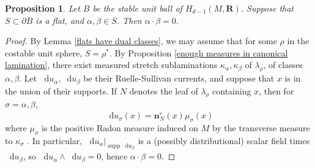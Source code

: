 \documentclass[reqno,11pt]{amsart}
\newcommand{\RR}{\mathbf{R}}
\newcommand*\dif{\mathop{}\!\mathrm{d}}
\DeclareMathOperator{\supp}{supp}
\newcommand{\normal}{\mathbf n}
\newtheorem{proposition}[theorem]{Proposition}
\theoremstyle{definition}
\numberwithin{equation}{section}
\begin{document}
\begin{proposition}\label{flats are nonintersecting}
Let $B$ be the stable unit ball of $H_{d - 1}(M, \RR)$.
Suppose that $S \subset \partial B$ is a flat, and $\alpha, \beta \in S$.
Then $\alpha \cdot \beta = 0$.
\end{proposition}
\begin{proof}
By Lemma \ref{flats have dual classes}, we may assume that for some $\rho$ in the costable unit sphere, $S = \rho^*$.
By Proposition \ref{enough measures in canonical lamination}, there exist measured stretch sublaminations $\kappa_\alpha, \kappa_\beta$ of $\lambda_\rho$, of classes $\alpha, \beta$.
Let $\dif u_\alpha, \dif u_\beta$ be their Ruelle-Sullivan currents, and suppose that $x$ is in the union of their supports.
If $N$ denotes the leaf of $\lambda_\rho$ containing $x$, then for $\sigma = \alpha, \beta$,
$$\dif u_\sigma(x) = \normal_N^\flat(x) \mu_\sigma(x)$$
where $\mu_\sigma$ is the positive Radon measure induced on $M$ by the transverse measure to $\kappa_\sigma$ \cite[Lemma 3.1]{BackusCML}.
In particular, $\dif u_\alpha|_{\supp \dif u_\beta}$ is a (possibly distributional) scalar field times $\dif u_\beta$, so $\dif u_\alpha \wedge \dif u_\beta = 0$, hence $\alpha \cdot \beta = 0$.
\end{proof}
\end{document}
